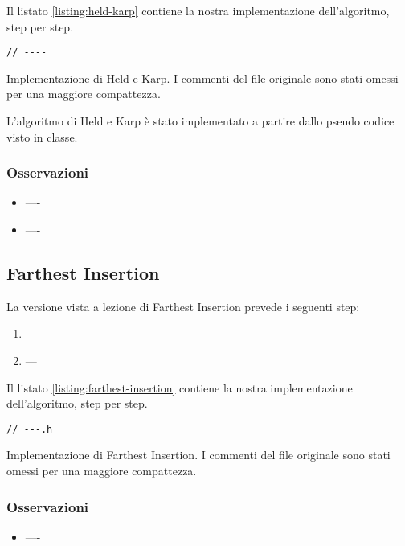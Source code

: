 \noindent Il listato \ref{listing:held-karp} contiene la nostra implementazione dell'algoritmo, step per step.

\begin{listing}[!ht]
\begin{verbatim}
// ----

\end{verbatim}
\caption{Implementazione di Held e Karp. I commenti del file originale sono stati omessi per una maggiore compattezza.}
\label{listing:held-karp}
\end{listing}

\noindent L'algoritmo di Held e Karp è stato implementato a partire dallo pseudo codice visto in classe. \\

\subsubsection{Osservazioni}

\begin{itemize}
    \item ----\\

    \item ----\\

\end{itemize}


\subsection{Farthest Insertion}

La versione vista a lezione di Farthest Insertion prevede i seguenti step:

\begin{enumerate}
    \item ---
    \item ---
\end{enumerate}

\noindent Il listato \ref{listing:farthest-insertion} contiene la nostra implementazione dell'algoritmo, step per step.

\begin{listing}[!ht]
\begin{verbatim}
// ---.h

\end{verbatim}
\caption{Implementazione di Farthest Insertion. I commenti del file originale sono stati omessi per una maggiore compattezza.}
\label{listing:farthest-insertion}
\end{listing}

\subsubsection{Osservazioni}
\begin{itemize}
    \item ----\\

\end{itemize}
